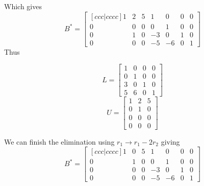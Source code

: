 Which gives
\begin{equation}
    B^{\ast} =
    \begin{bmatrix}[ccc|cccc]
        1           &           2       &       5       &       1   &   0   &   0   &   0   \\       
        0           &           0       &       0       &       0   &   1   &   0   &   0   \\        
        0           &           1       &       0       &       -3  &   0   &   1   &   0   \\        
        0           &           0       &       0       &       -5  &   -6  &   0   &   1        
    \end{bmatrix}
\end{equation}
Thus
\begin{mdframed}[style=MyFrame]
    \begin{equation}
        L =
        \begin{bmatrix}
            1       &   0   &   0   &   0   \\
            0       &   1   &   0   &   0   \\
            3       &   0   &   1   &   0   \\
            5       &   6   &   0   &   1
        \end{bmatrix}
    \end{equation}
    \begin{equation}
        U =
        \begin{bmatrix}
            1       &   2   &   5       \\
            0       &   1   &   0       \\
            0       &   0   &   0       \\
            0       &   0   &   0
        \end{bmatrix}
    \end{equation}
\end{mdframed}
We can finish the elimination using $r_{1} \rightarrow r_{1} - 2r_{2}$ giving 
\begin{equation}
    B^{\ast} =
    \begin{bmatrix}[ccc|cccc]
        1           &           0       &       5       &       1   &   0   &   0   &   0   \\       
        0           &           1       &       0       &       0   &   1   &   0   &   0   \\        
        0           &           0       &       0       &       -3  &   0   &   1   &   0   \\        
        0           &           0       &       0       &       -5  &   -6  &   0   &   1        
    \end{bmatrix}
\end{equation}
